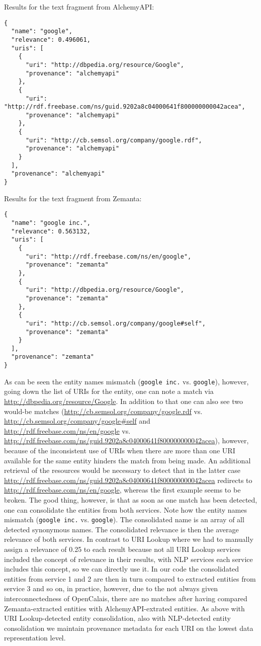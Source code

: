 \documentclass{acm_proc_article-sp}
\begin{document}
Results for the text fragment from AlchemyAPI:
\begin{verbatim}
{
  "name": "google",
  "relevance": 0.496061,
  "uris": [
    {
      "uri": "http://dbpedia.org/resource/Google",
      "provenance": "alchemyapi" 
    },
    {
      "uri": "http://rdf.freebase.com/ns/guid.9202a8c04000641f800000000042acea",
      "provenance": "alchemyapi" 
    },
    {
      "uri": "http://cb.semsol.org/company/google.rdf",
      "provenance": "alchemyapi" 
    } 
  ],
  "provenance": "alchemyapi" 
}
\end{verbatim}
Results for the text fragment from Zemanta:
\begin{verbatim}
{
  "name": "google inc.",
  "relevance": 0.563132,
  "uris": [
    {
      "uri": "http://rdf.freebase.com/ns/en/google",
      "provenance": "zemanta" 
    },
    {
      "uri": "http://dbpedia.org/resource/Google",
      "provenance": "zemanta" 
    },
    {
      "uri": "http://cb.semsol.org/company/google#self",
      "provenance": "zemanta" 
    } 
  ],
  "provenance": "zemanta" 
}
\end{verbatim}
As can be seen the entity names mismatch (\texttt{google inc.} vs. \texttt{google}), however, going down the list of URIs for the entity, one can note a match via \url{http://dbpedia.org/resource/Google}. In addition to that one can also see two would-be matches (\url{http://cb.semsol.org/company/google.rdf} vs. \url{http://cb.semsol.org/company/google#self} and \url{http://rdf.freebase.com/ns/en/google} vs. \url{http://rdf.freebase.com/ns/guid.9202a8c04000641f800000000042acea}), however, because of the inconsistent use of URIs when there are more than one URI available for the same entity hinders the match from being made. An additional retrieval of the resources would be necessary to detect that in the latter case \url{http://rdf.freebase.com/ns/guid.9202a8c04000641f800000000042acea} redirects to \url{http://rdf.freebase.com/ns/en/google}, whereas the first example seems to be broken. The good thing, however, is that as soon as one match has been detected, one can consolidate the entities from both services. Note how the entity names mismatch (\texttt{google inc.} vs. \texttt{google}). The consolidated name is an array of all detected synonymous names. The consolidated relevance is then the average relevance of both services. In contrast to URI Lookup where we had to manually assign a relevance of 0.25 to each result because not all URI Lookup services included the concept of relevance in their results, with NLP services each service includes this concept, so we can directly use it. In our code the consolidated entities from service 1 and 2 are then in turn compared to extracted entities from service 3 and so on, in practice, however, due to the not always given interconnectedness of OpenCalais, there are no matches after having compared Zemanta-extracted entities with AlchemyAPI-extrated entities. As above with URI Lookup-detected entity consolidation, also with NLP-detected entity consolidation we maintain provenance metadata for each URI on the lowest data representation level.  
\end{document}
